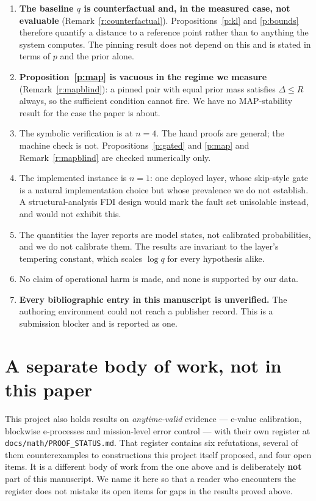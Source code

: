\documentclass[11pt,a4paper]{article}
\newcommand{\code}[1]{\texttt{\small #1}}
\theoremstyle{definition}
\begin{document}
\begin{enumerate}
\item \textbf{The baseline $q$ is counterfactual and, in the measured case, not
      evaluable} (Remark~\ref{r:counterfactual}). Propositions~\ref{p:kl} and
      \ref{p:bounds} therefore quantify a distance to a reference point rather
      than to anything the system computes. The pinning result does not depend
      on this and is stated in terms of $p$ and the prior alone.
\item \textbf{Proposition~\ref{p:map} is vacuous in the regime we measure}
      (Remark~\ref{r:mapblind}): a pinned pair with equal prior mass satisfies
      $\Delta\le R$ always, so the sufficient condition cannot fire. We have
      no MAP-stability result for the case the paper is about.
\item The symbolic verification is at $n=4$. The hand proofs are general; the
      machine check is not. Propositions~\ref{p:gated} and \ref{p:map} and
      Remark~\ref{r:mapblind} are checked numerically only.
\item The implemented instance is $n=1$: one deployed layer, whose skip-style
      gate is a natural implementation choice but whose prevalence we do not
      establish. A structural-analysis FDI design would mark the fault set
      unisolable instead, and would not exhibit this.
\item The quantities the layer reports are model states, not calibrated
      probabilities, and we do not calibrate them. The results are invariant to
      the layer's tempering constant, which scales $\log q$ for every
      hypothesis alike.
\item No claim of operational harm is made, and none is supported by our data.
\item \textbf{Every bibliographic entry in this manuscript is unverified.} The
      authoring environment could not reach a publisher record. This is a
      submission blocker and is reported as one.
\end{enumerate}

\section*{A separate body of work, not in this paper}

This project also holds results on \emph{anytime-valid} evidence --- e-value
calibration, blockwise e-processes and mission-level error control --- with
their own register at \code{docs/math/PROOF\_STATUS.md}. That register contains
six refutations, several of them counterexamples to constructions this project
itself proposed, and four open items. It is a different body of work from the
one above and is deliberately \textbf{not} part of this manuscript. We name it
here so that a reader who encounters the register does not mistake its open
items for gaps in the results proved above.



\end{document}

